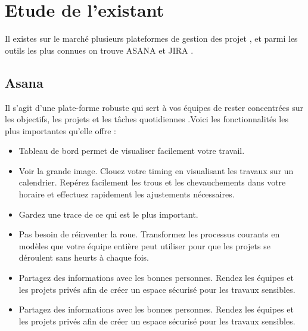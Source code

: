\section{ Etude de l'existant  }



Il existes sur le march\'{e} plusieurs plateformes de gestion des projet , et parmi
les outils les plus connues on trouve ASANA et JIRA .

\subsection{Asana}

Il s'agit d'une plate-forme robuste qui sert \`{a} vos \'{e}quipes de rester concentr\'{e}es
sur les objectifs, les projets et les t\^{a}ches quotidiennes .Voici les
fonctionnalit\'{e}s les plus importantes qu'elle offre :


\begin{itemize}
\item{Tableau de bord permet de visualiser facilement votre travail.}

\item{ Voir la grande image. Clouez votre timing en visualisant les travaux sur
un calendrier. Rep\'{e}rez facilement les trous et les chevauchements dans
votre horaire et effectuez rapidement les ajustements n\'{e}cessaires.}

\item{Gardez une trace de ce qui est le plus important.}

\item{Pas besoin de r\'{e}inventer la roue. Transformez les processus courants en
mod\`{e}les que votre \'{e}quipe enti\`{e}re peut utiliser pour que les projets se
d\'{e}roulent sans heurts \`{a} chaque fois.}

\item{Partagez des informations avec les bonnes personnes. Rendez les
\'{e}quipes et les projets priv\'{e}s afin de cr\'{e}er un espace s\'{e}curis\'{e} pour les
travaux sensibles.}

\item{Partagez des informations avec les bonnes personnes. Rendez les
\'{e}quipes et les projets priv\'{e}s afin de cr\'{e}er un espace s\'{e}curis\'{e} pour les
travaux sensibles.}

\end{itemize}

